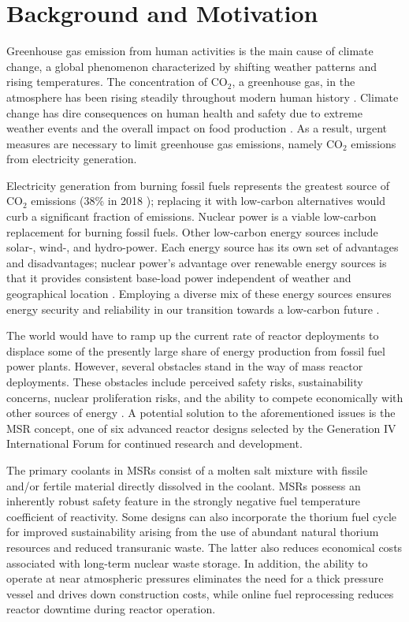 \section{Background and Motivation}

Greenhouse gas emission from human activities is the main cause of climate
change, a global phenomenon characterized by shifting weather patterns and
rising temperatures. The concentration of CO$_2$, a greenhouse gas, in the
atmosphere has been rising steadily throughout modern human history
\cite{us_department_of_commerce_global_2020}. Climate change has dire
consequences on human health and safety due to extreme weather events and the
overall impact on food production \cite{mcmichael_global_2004}. As a result,
urgent measures are necessary to limit greenhouse gas emissions, namely CO$_2$
emissions from electricity generation.

Electricity generation from burning fossil fuels represents the
greatest source of CO$_2$ emissions (38\% in 2018 \cite{iea_global_2019});
replacing it with low-carbon
alternatives would curb a significant fraction of emissions. Nuclear power is
a viable low-carbon replacement for burning fossil fuels.
Other low-carbon energy sources include solar-, wind-, and hydro-power. Each
energy source has its own set of advantages and disadvantages; nuclear power's
advantage over renewable energy sources is that it provides consistent
base-load power independent of weather and geographical location
\cite{petti_future_2018}. Employing a diverse mix of these energy sources
ensures energy security and reliability in our transition
towards a low-carbon future \cite{petti_future_2018}.

The world would have to ramp up the current rate of reactor deployments to
displace some of the presently large share of energy production from fossil
fuel power plants. However, several obstacles stand in the way of mass reactor
deployments. These obstacles include perceived safety risks, sustainability
concerns, nuclear proliferation
risks, and the ability to compete economically with other sources of energy
\cite{massachusetts_institute_of_technology_future_2003}. A potential solution
to the aforementioned issues is the \gls{MSR} concept, one of six advanced
reactor designs selected by the Generation IV International Forum
\cite{gif_technology_2002} for continued research and development.

The primary coolants in MSRs consist of a molten salt mixture
with fissile and/or fertile material directly dissolved in the coolant.
MSRs possess an inherently robust safety feature in the strongly negative fuel
temperature coefficient of reactivity. Some designs can also incorporate the
thorium fuel cycle for improved sustainability arising from the use of
abundant natural thorium resources and reduced transuranic waste. The
latter also reduces economical costs
associated with long-term nuclear waste storage. In addition, the ability to
operate at near atmospheric pressures eliminates the need for a thick pressure
vessel and drives down construction costs, while online fuel reprocessing
reduces reactor downtime during reactor operation.

